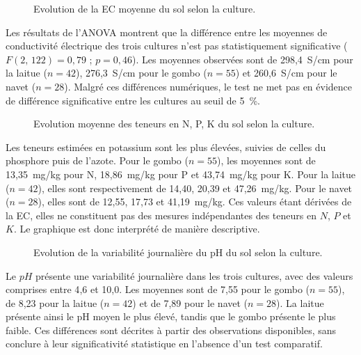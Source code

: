 \begin{figure}[H]
    \centering
    \caption{Evolution de la EC  moyenne du sol selon la culture. }
    \label{fig:ec-moyensol5}
\end{figure}
Les résultats de l'ANOVA montrent que la différence entre les moyennes de conductivité électrique des trois cultures n'est pas statistiquement significative ($F(2,\,122) = 0{,}79$ ; $p = 0{,}46$). Les moyennes observées sont de 298,4~\textmu S/cm pour la laitue ($n = 42$), 276,3~\textmu S/cm pour le gombo ($n = 55$) et 260,6~\textmu S/cm pour le navet ($n = 28$). Malgré ces différences numériques, le test ne met pas en évidence de différence significative entre les cultures au seuil de 5~\%.

\begin{figure}[H]
    \centering
    \caption{Evolution moyenne des teneurs en N, P, K du sol selon la culture. }
    \label{fig:evolutionNPK5}
\end{figure}
Les teneurs estimées en potassium sont les plus élevées, suivies de celles du phosphore puis de l’azote. Pour le gombo ($n = 55$), les moyennes sont de 13,35~mg/kg pour N, 18,86~mg/kg pour P et 43,74~mg/kg pour K. Pour la laitue ($n = 42$), elles sont respectivement de 14,40, 20,39 et 47,26~mg/kg. Pour le navet ($n = 28$), elles sont de 12,55, 17,73 et 41,19~mg/kg. Ces valeurs étant dérivées de la EC, elles ne constituent pas des mesures indépendantes des teneurs en $N$, $P$ et $K$. Le graphique est donc interprété de manière descriptive.

\begin{figure}[H]
    \centering
    \caption{Evolution de la variabilité journalière du pH du sol selon la culture. }
    \label{fig:ph-boxplot5}
\end{figure}
Le $pH$ présente une variabilité journalière dans les trois cultures, avec des valeurs comprises entre 4{,}6 et 10{,}0. Les moyennes sont de 7{,}55 pour le gombo ($n = 55$), de 8{,}23 pour la laitue ($n = 42$) et de 7{,}89 pour le navet ($n = 28$). La laitue présente ainsi le pH moyen le plus élevé, tandis que le gombo présente le plus faible. Ces différences sont décrites à partir des observations disponibles, sans conclure à leur significativité statistique en l’absence d’un test comparatif.

